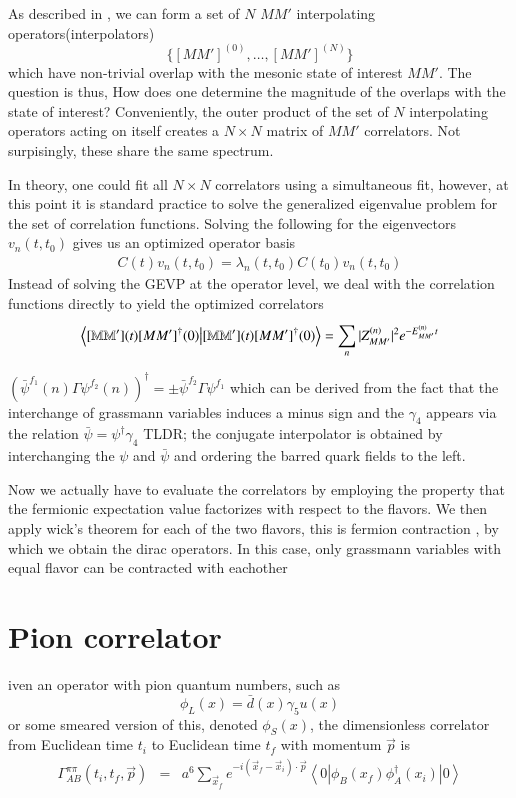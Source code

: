 As described in , we can form a set of $N$ $MM'$ interpolating operators(interpolators) $$\{[MM']^{(0)},\dots,[MM']^{(N)}\}$$ which have non-trivial overlap with the mesonic state of interest $MM'$. The question is thus, How does one determine the magnitude of the overlaps with the state of interest? Conveniently, the outer product of the set of $N$ interpolating operators acting on itself creates a $N \times N$ matrix of $MM'$ correlators. Not surpisingly, these share the same spectrum. 

In theory, one could fit all $N \times N$ correlators using a simultaneous fit, however, at this point it is standard practice to solve the generalized eigenvalue problem for the set of correlation functions. Solving the following for the eigenvectors $v_n(t,t_0)$ gives us an optimized operator basis
\begin{align}
    C(t)v_n(t,t_0) = \lambda_n(t,t_0)C(t_0)v_n(t,t_0)
\end{align}
Instead of solving the GEVP at the operator level, we deal with the correlation functions directly to yield the optimized correlators 
\begin{align}
    \braket{[\mathbb{MM'}](t) [MM']^\dagger(0)} = \sum_{n}^{} |Z_{MM'}^{(n)}|^2 e^{-E_{MM'}^{(n)}t} 
\end{align}


$(\bar{\psi}^{f_1}(n)\Gamma\psi^{f_2}(n))^{\dagger} = \pm \bar{\psi}^{f_2} \Gamma \psi^{f_1}$
which can be derived from the fact that the interchange of grassmann variables induces a minus sign and the $\gamma_4$ appears via the relation $\bar{\psi} = \psi^{\dagger}\gamma_4$
TLDR; the conjugate interpolator is obtained by interchanging the $\psi$ and $\bar{\psi}$ and ordering the barred quark fields to the left. 

Now we actually have to evaluate the correlators by employing the property that the fermionic expectation value factorizes with respect to the flavors. We then apply wick's theorem for each of the two flavors, this is fermion contraction , by which we obtain the dirac operators. In this case, only grassmann variables with equal flavor can be contracted with eachother

\section{Pion correlator} 
iven an operator with pion quantum numbers, such as
\[
\phi_L(x) = \bar{d}(x)\gamma_5u(x)
\]
or some smeared version of this, denoted $\phi_S(x)$,
the dimensionless correlator from Euclidean time $t_i$ to Euclidean time $t_f$
with momentum $\vec p$ is
\begin{eqnarray}
\Gamma^{\pi\pi}_{AB}(t_i,t_f,\vec{p})
 &=& a^6\sum_{{\vec x}_f}e^{-i(\vec{x}_f-\vec{x}_i)\cdot\vec{p}}
     \left<0\left|\phi_B(x_f)\phi_A^\dagger(x_i)\right|0\right> \nonumber \\

\end{eqnarray}


